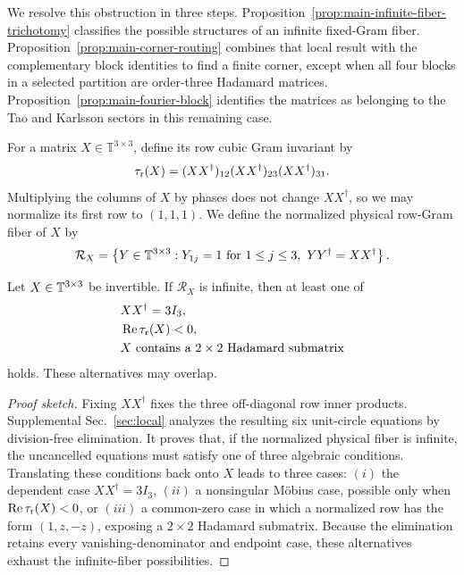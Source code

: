 We resolve this obstruction in three steps. Proposition~\ref{prop:main-infinite-fiber-trichotomy} classifies the possible structures of an infinite fixed-Gram fiber. Proposition~\ref{prop:main-corner-routing} combines that local result with the complementary block identities to find a finite corner, except when all four blocks in a selected partition are order-three Hadamard matrices. Proposition~\ref{prop:main-fourier-block} identifies the matrices
as belonging to the Tao and Karlsson sectors in this remaining case.

For a matrix $X \in \mathbb{T}^{3 \times 3}$, define its row cubic Gram invariant by
\begin{equation}
\tau_{\rm r}(X)
=(XX^\dagger)_{12}(XX^\dagger)_{23}(XX^\dagger)_{31}.
\label{eq:main-row-cubic-invariant}
\end{equation}
Multiplying the columns of $X$ by phases does not change $XX^\dagger$,
so we may normalize its first row to $(1,1,1)$. We define the normalized physical row-Gram fiber of $X$ by
\begin{equation}
\mathcal R_X=
\left\{
Y\in\T^{3\times3}:
Y_{1j}=1\ \text{for }1\leq j\leq3,\ 
YY^\dagger=XX^\dagger
\right\}.
\label{eq:main-normalized-fiber}
\end{equation}

\begin{proposition}
\label{prop:main-infinite-fiber-trichotomy}
Let $X\in\mathbb T^{3\times3}$ be invertible. If $\mathcal R_X$ is infinite,
then at least one of
\begin{equation}
\begin{aligned}
&XX^\dagger=3I_3,\\
&\operatorname{Re}\tau_{\rm r}(X)<0,\\
&X\text{ contains a }2\times2\text{ Hadamard submatrix}
\end{aligned}
\label{eq:main-fixed-gram-trichotomy}
\end{equation}
holds. These alternatives may overlap.
\end{proposition}

\begin{proof}[Proof sketch]
Fixing $XX^\dagger$ fixes the three off-diagonal row inner products. Supplemental Sec.~\ref{sec:local} analyzes the resulting six unit-circle equations by division-free elimination. It proves that, if the normalized physical fiber is infinite, the uncancelled equations must satisfy one of three algebraic conditions.
Translating these conditions back onto $X$ leads to three cases: $(i)$ the dependent case $XX^\dagger=3I_3$, $(ii)$ a nonsingular M\"obius case, possible only when $\operatorname{Re}\tau_{\rm r}(X)<0$, or $(iii)$ a common-zero case in which a normalized row has the form $(1,z,-z)$, exposing a $2\times2$ Hadamard submatrix. Because the elimination retains every vanishing-denominator and endpoint case, these alternatives exhaust the infinite-fiber possibilities.
\end{proof}

